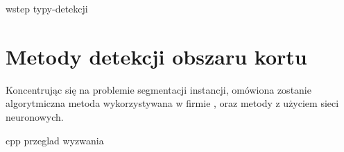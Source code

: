 {wstep}
{typy-detekcji}

\section{Metody detekcji obszaru kortu}
\label{sec:metody_detekcji}

Koncentrując się na problemie segmentacji instancji, omówiona zostanie algorytmiczna metoda wykorzystywana w firmie \blue{}, oraz metody z użyciem sieci neuronowych. \\


{cpp}
{przeglad}
{wyzwania}
